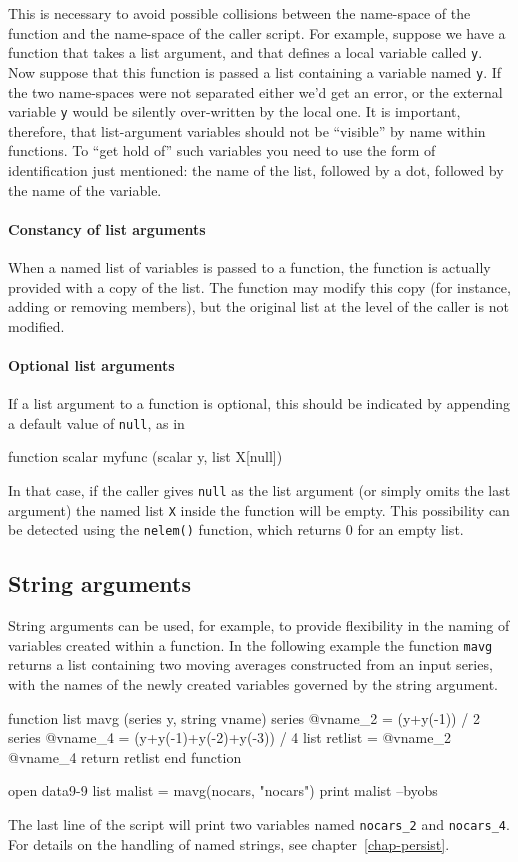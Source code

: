 This is necessary to avoid possible collisions between the name-space
of the function and the name-space of the caller script.  For example,
suppose we have a function that takes a list argument, and that
defines a local variable called \texttt{y}.  Now suppose that this
function is passed a list containing a variable named \texttt{y}.  If
the two name-spaces were not separated either we'd get an error, or
the external variable \texttt{y} would be silently over-written by the
local one.  It is important, therefore, that list-argument variables
should not be ``visible'' by name within functions.  To ``get hold
of'' such variables you need to use the form of identification just
mentioned: the name of the list, followed by a dot, followed by the
name of the variable.

\paragraph{Constancy of list arguments} When a named list of
variables is passed to a function, the function is actually provided
with a copy of the list.  The function may modify this copy (for
instance, adding or removing members), but the original list at the
level of the caller is not modified.

\paragraph{Optional list arguments} If a list argument to a function is
optional, this should be indicated by appending a default value of
\texttt{null}, as in
%
\begin{code}
function scalar myfunc (scalar y, list X[null])
\end{code}
%
In that case, if the caller gives \texttt{null} as the list argument
(or simply omits the last argument) the named list \texttt{X} inside the
function will be empty.  This possibility can be detected using the
\texttt{nelem()} function, which returns 0 for an empty list.

\subsection{String arguments}

String arguments can be used, for example, to provide flexibility in
the naming of variables created within a function.  In the following
example the function \texttt{mavg} returns a list containing two
moving averages constructed from an input series, with the names of
the newly created variables governed by the string argument.
%
\begin{code}
function list mavg (series y, string vname)
   series @vname_2 = (y+y(-1)) / 2
   series @vname_4 = (y+y(-1)+y(-2)+y(-3)) / 4
   list retlist = @vname_2 @vname_4
   return retlist
end function

open data9-9
list malist = mavg(nocars, "nocars")
print malist --byobs
\end{code}
%
The last line of the script will print two variables named
\verb|nocars_2| and \verb|nocars_4|.  For details on the handling of
named strings, see chapter~\ref{chap-persist}.

